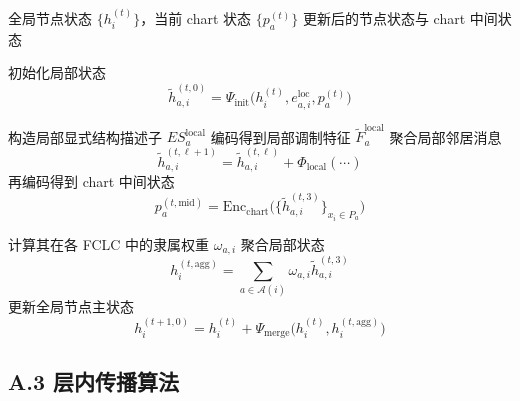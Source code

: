 \documentclass[12pt,a4paper]{ctexart}
\begin{document}
\begin{algorithm}[H]
\caption{Node Dual-state Update inside FCLCs}
\begin{algorithmic}[1]
\Require 全局节点状态 \(\{h_i^{(t)}\}\)，当前 chart 状态 \(\{p_a^{(t)}\}\)
\Ensure 更新后的节点状态与 chart 中间状态

        \State 初始化局部状态
        \[
        \tilde h_{a,i}^{(t,0)}
        =
        \Psi_{\mathrm{init}}
        \big(
        h_i^{(t)},
        e_{a,i}^{\mathrm{loc}},
        p_a^{(t)}
        \big)
        \]
    \EndFor
\EndFor

    \State 构造局部显式结构描述子 \(ES_a^{\mathrm{local}}\)
    \State 编码得到局部调制特征 \(\tilde F_a^{\mathrm{local}}\)
            \State 聚合局部邻居消息
            \[
            \tilde h_{a,i}^{(t,\ell+1)}
            =
            \tilde h_{a,i}^{(t,\ell)}
            +
            \Phi_{\mathrm{local}}(\cdots)
            \]
        \EndFor
    \EndFor
    \State 再编码得到 chart 中间状态
    \[
    p_a^{(t,\mathrm{mid})}
    =
    \mathrm{Enc}_{\mathrm{chart}}
    \big(
    \{\tilde h_{a,i}^{(t,3)}\}_{x_i\in P_a}
    \big)
    \]
\EndFor

    \State 计算其在各 FCLC 中的隶属权重 \(\omega_{a,i}\)
    \State 聚合局部状态
    \[
    h_i^{(t,\mathrm{agg})}
    =
    \sum_{a\in\mathcal A(i)}
    \omega_{a,i}\tilde h_{a,i}^{(t,3)}
    \]
    \State 更新全局节点主状态
    \[
    h_i^{(t+1,0)}
    =
    h_i^{(t)}
    +
    \Psi_{\mathrm{merge}}
    \big(
    h_i^{(t)},
    h_i^{(t,\mathrm{agg})}
    \big)
    \]
\EndFor
\end{algorithmic}
\end{algorithm}

\subsection{A.3 层内传播算法}
\end{document}
